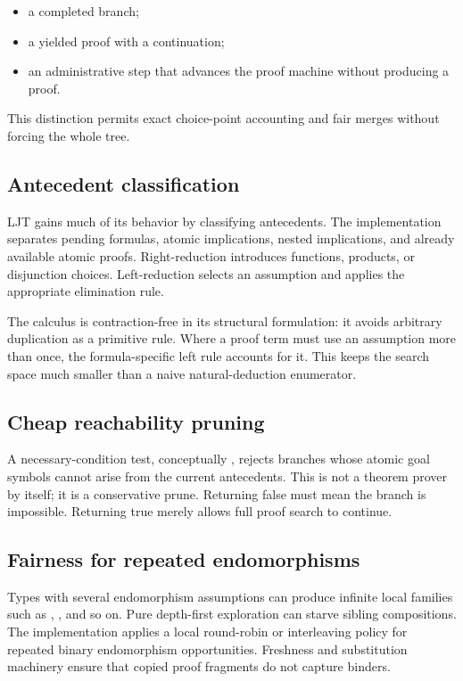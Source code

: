 \documentclass[10pt,letterpaper,oneside]{report}
\newcommand{\code}[1]{\texttt{\detokenize{#1}}}
\begin{document}
\begin{itemize}
  \item a completed branch;
  \item a yielded proof with a continuation;
  \item an administrative step that advances the proof machine without producing a proof.
\end{itemize}

This distinction permits exact choice-point accounting and fair merges without forcing the whole tree.

\subsection{Antecedent classification}

LJT gains much of its behavior by classifying antecedents. The implementation separates pending formulas, atomic implications, nested implications, and already available atomic proofs. Right-reduction introduces functions, products, or disjunction choices. Left-reduction selects an assumption and applies the appropriate elimination rule.

The calculus is contraction-free in its structural formulation: it avoids arbitrary duplication as a primitive rule. Where a proof term must use an assumption more than once, the formula-specific left rule accounts for it. This keeps the search space much smaller than a naive natural-deduction enumerator.

\subsection{Cheap reachability pruning}

A necessary-condition test, conceptually \code{goalMayBeReachable}, rejects branches whose atomic goal symbols cannot arise from the current antecedents. This is not a theorem prover by itself; it is a conservative prune. Returning false must mean the branch is impossible. Returning true merely allows full proof search to continue.

\subsection{Fairness for repeated endomorphisms}

Types with several endomorphism assumptions can produce infinite local families such as \code{f x}, \code{f (f x)}, and so on. Pure depth-first exploration can starve sibling compositions. The implementation applies a local round-robin or interleaving policy for repeated binary endomorphism opportunities. Freshness and substitution machinery ensure that copied proof fragments do not capture binders.
\end{document}
